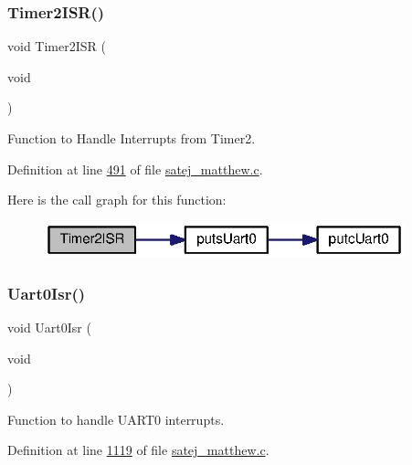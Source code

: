 \subsubsection{\texorpdfstring{Timer2ISR()}{Timer2ISR()}}
{\footnotesize\ttfamily void Timer2\+I\+SR (\begin{DoxyParamCaption}\item[{void}]{ }\end{DoxyParamCaption})}



Function to Handle Interrupts from Timer2. 



Definition at line \mbox{\hyperlink{satej__matthew_8c_source_l00491}{491}} of file \mbox{\hyperlink{satej__matthew_8c_source}{satej\+\_\+matthew.\+c}}.

Here is the call graph for this function\+:\nopagebreak
\begin{figure}[H]
\begin{center}
\leavevmode
\includegraphics[width=296pt]{satej__matthew_8c_af0a12620be9cfe02c43ff4c8d6556fe2_cgraph}
\end{center}
\end{figure}
\mbox{\label{satej__matthew_8c_a039b2e346ff80ac384bb076fc5290996}} 
\subsubsection{\texorpdfstring{Uart0Isr()}{Uart0Isr()}}
{\footnotesize\ttfamily void Uart0\+Isr (\begin{DoxyParamCaption}\item[{void}]{ }\end{DoxyParamCaption})}



Function to handle U\+A\+R\+T0 interrupts. 



Definition at line \mbox{\hyperlink{satej__matthew_8c_source_l01119}{1119}} of file \mbox{\hyperlink{satej__matthew_8c_source}{satej\+\_\+matthew.\+c}}.

